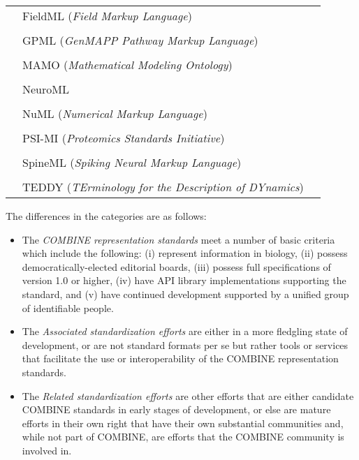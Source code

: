 \begin{center}
\begin{tabular}{P{0.95in}P{2.825in}l}
    \\[-8pt]    
    & FieldML (\emph{Field Markup Language})		& \cite{christie_2009}\\
    \\[-8pt]
    & GPML (\emph{GenMAPP Pathway Markup Language})	& \cite{gpml_2014}\\
    \\[-8pt]    
    & MAMO (\emph{Mathematical Modeling Ontology})	& \cite{mamo_2014}\\
    \\[-8pt]    
    & NeuroML 						& \cite{gleeson_2010}\\
    \\[-8pt]    
    & NuML (\emph{Numerical Markup Language})		& \cite{dada_2010}\\
    \\[-8pt]    
    & PSI-MI (\emph{Proteomics Standards Initiative})	& \cite{hermjakob_2004}\\
    \\[-8pt]    
    & SpineML (\emph{Spiking Neural Markup Language})	& \cite{richmond2014model}\\
    \\[-8pt]    
    & TEDDY (\emph{TErminology for the Description of DYnamics}) & \cite{courtot2011a}\\
    \bottomrule
  \end{tabular}
\end{center}\vspace{-0.85em}

The differences in the categories are as follows:

\begin{itemize}\vspace*{-1em}

\item The \emph{COMBINE representation standards} meet a number of basic criteria which include the following: (i) represent information in biology, (ii) possess democratically-elected editorial boards, (iii) possess full specifications of version 1.0 or higher, (iv) have API library implementations supporting the standard, and (v) have continued development supported by a unified group of identifiable people.

\item The \emph{Associated standardization efforts} are either in a more fledgling state of development, or are not standard formats per se but rather tools or services that facilitate the use or interoperability of the COMBINE representation standards.

\item The \emph{Related standardization efforts} are other efforts that are either candidate COMBINE standards in early stages of development, or else are mature efforts in their own right that have their own substantial communities and, while not part of COMBINE, are efforts that the COMBINE community is involved in.

\end{itemize}\vspace*{-1em}


